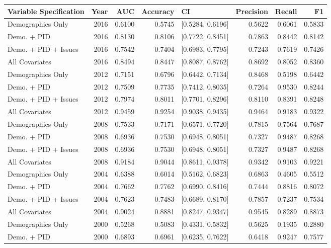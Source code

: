 \begin{longtable}{lrrrlrrr}
  \toprule
Variable Specification & Year & AUC & Accuracy & CI & Precision & Recall & F1 \\ 
  \midrule
Demographics Only & 2016 & 0.6100 & 0.5745 & [0.5284, 0.6196] & 0.5622 & 0.6061 & 0.5833 \\ 
  Demo. + PID & 2016 & 0.8130 & 0.8106 & [0.7722, 0.8451] & 0.7863 & 0.8442 & 0.8142 \\ 
  Demo. + PID + Issues & 2016 & 0.7542 & 0.7404 & [0.6983, 0.7795] & 0.7243 & 0.7619 & 0.7426 \\ 
  All Covariates & 2016 & 0.8494 & 0.8447 & [0.8087, 0.8762] & 0.8692 & 0.8052 & 0.8360 \\ 
  Demographics Only & 2012 & 0.7151 & 0.6796 & [0.6442, 0.7134] & 0.8468 & 0.5198 & 0.6442 \\ 
  Demo. + PID & 2012 & 0.7509 & 0.7735 & [0.7412, 0.8035] & 0.7264 & 0.9530 & 0.8244 \\ 
  Demo. + PID + Issues & 2012 & 0.7974 & 0.8011 & [0.7701, 0.8296] & 0.8110 & 0.8391 & 0.8248 \\ 
  All Covariates & 2012 & 0.9459 & 0.9254 & [0.9038, 0.9435] & 0.9464 & 0.9183 & 0.9322 \\ 
  Demographics Only & 2008 & 0.7533 & 0.7171 & [0.6571, 0.7720] & 0.7815 & 0.7564 & 0.7687 \\ 
  Demo. + PID & 2008 & 0.6936 & 0.7530 & [0.6948, 0.8051] & 0.7327 & 0.9487 & 0.8268 \\ 
  Demo. + PID + Issues & 2008 & 0.6936 & 0.7530 & [0.6948, 0.8051] & 0.7327 & 0.9487 & 0.8268 \\ 
  All Covariates & 2008 & 0.9184 & 0.9044 & [0.8611, 0.9378] & 0.9342 & 0.9103 & 0.9221 \\ 
  Demographics Only & 2004 & 0.6388 & 0.6014 & [0.5162, 0.6823] & 0.6863 & 0.4605 & 0.5512 \\ 
  Demo. + PID & 2004 & 0.7662 & 0.7762 & [0.6990, 0.8416] & 0.7444 & 0.8816 & 0.8072 \\ 
  Demo. + PID + Issues & 2004 & 0.7623 & 0.7483 & [0.6689, 0.8170] & 0.7857 & 0.7237 & 0.7534 \\ 
  All Covariates & 2004 & 0.9024 & 0.8881 & [0.8247, 0.9347] & 0.9545 & 0.8289 & 0.8873 \\ 
  Demographics Only & 2000 & 0.5268 & 0.5083 & [0.4331, 0.5832] & 0.5625 & 0.1935 & 0.2880 \\ 
  Demo. + PID & 2000 & 0.6893 & 0.6961 & [0.6235, 0.7622] & 0.6418 & 0.9247 & 0.7577 \\ 

\end{longtable}
